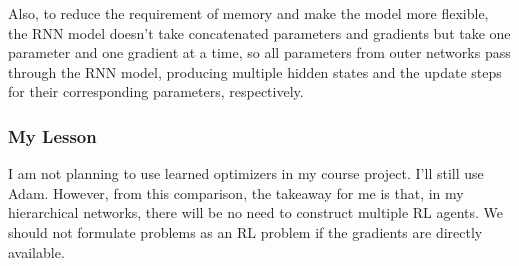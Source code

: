 Also, to reduce the requirement of memory and make the model more flexible, the RNN model doesn't take concatenated parameters and gradients but take one parameter and one gradient at a time, so all parameters from outer networks pass through the RNN model, producing multiple hidden states and the update steps for their corresponding parameters, respectively.

\subsubsection{My Lesson}
I am not planning to use learned optimizers in my course project.
I'll still use Adam.
However, from this comparison, the takeaway for me is that, in my hierarchical networks, there will be no need to construct multiple RL agents.
We should not formulate problems as an RL problem if the gradients are directly available.






